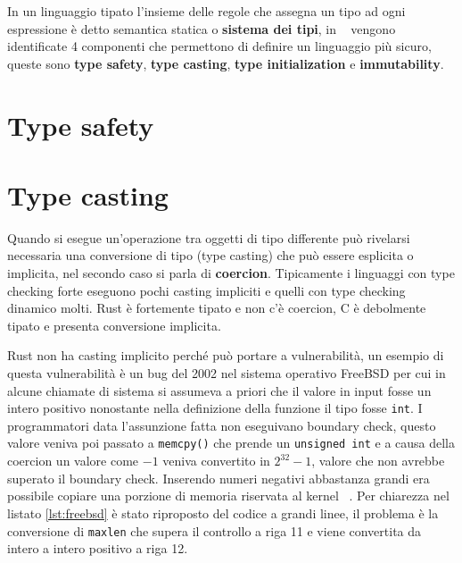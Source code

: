 \documentclass[Lau,binding=0.6cm]{sapthesis}
\newcommand{\textcode}[1]{\colorbox{backcolour}{\texttt{#1}}}
\begin{document}
In un linguaggio tipato l'insieme delle regole che assegna un tipo ad ogni espressione è detto semantica statica o \textbf{sistema dei tipi}, in ~\cite{security_framework} vengono identificate 4 componenti che permettono di definire un linguaggio più sicuro, queste sono \textbf{type safety}, \textbf{type casting}, \textbf{type initialization} e \textbf{immutability}.

\section{Type safety}
 
\section{Type casting}
Quando si esegue un'operazione tra oggetti di tipo differente può rivelarsi necessaria una conversione di tipo (type casting) che può essere esplicita o implicita, nel secondo caso si parla di \textbf{coercion}.
Tipicamente i linguaggi con type checking forte eseguono pochi casting impliciti e quelli con type checking dinamico molti.
Rust è fortemente tipato e non c'è coercion, C è debolmente tipato e presenta conversione implicita.   







Rust non ha casting implicito perché può portare a vulnerabilità, un esempio di questa vulnerabilità è un bug del 2002 nel sistema operativo FreeBSD per cui in alcune chiamate di sistema si assumeva a priori che il valore in input fosse un intero positivo nonostante nella definizione della funzione il tipo fosse \textcode{int}.
I programmatori data l'assunzione fatta non eseguivano boundary check, questo valore veniva poi passato a \textcode{memcpy()} che prende un \textcode{unsigned int} e a causa della coercion un valore come $ -1 $ veniva convertito in $ 2^{32}-1 $, valore che non avrebbe superato il boundary check.
Inserendo numeri negativi abbastanza grandi era possibile copiare una porzione di memoria riservata al kernel ~\cite{freeBSD_vulnerability}.
Per chiarezza nel listato \ref{lst:freebsd} è stato riproposto del codice a grandi linee, il problema è la conversione di \texttt{maxlen} che supera il controllo a riga 11 e viene convertita da intero a intero positivo a riga 12. 
\end{document}
